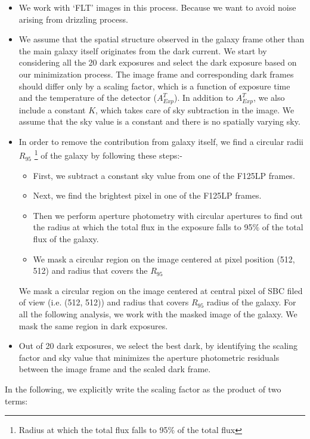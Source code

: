\documentclass[11pt]{article}
\begin{document}
\begin{itemize}
	\item We work with `FLT' images in this process. Because we want to avoid noise arising from drizzling process.
	\item We assume that the spatial structure observed in the galaxy frame other than the main galaxy itself originates from the dark current. We start by considering all the 20 dark exposures and select the dark exposure based on our minimization process. The image frame and corresponding dark frames should differ only by a scaling factor, which is a function of exposure time and the temperature of the detector ($A^T_{Exp}$). In addition to $A^T_{Exp}$, we also include a constant $K$, which takes care of sky subtraction in the image. We assume that the sky value is a constant and there is no spatially varying sky.
	\item In order to remove the contribution from galaxy itself, we find a circular radii $R_{95}$ \footnote{Radius at which the total flux falls to 95$\%$  of the total flux} of the galaxy by following these steps:-
	\begin{itemize}
		\item First, we subtract a constant sky value from one of the F125LP frames.
		\item Next, we find the brightest pixel in one of the F125LP frames. 
		\item Then we perform aperture photometry with circular apertures to find out the radius at which the total flux in the exposure falls to 95$\%$  of the total flux of the galaxy.
		\item We mask a circular region on the image centered at pixel position (512, 512) and radius that covers the $R_{95}$
	\end{itemize}  We mask a circular region on the image centered at central pixel of SBC filed of view (i.e. (512, 512)) and radius that covers $R_{95}$ radius of the galaxy. For all the following analysis, we work with the masked image of the galaxy. We mask the same region in dark exposures.

	 \item Out of 20 dark exposures, we select the best dark, by identifying the scaling factor and sky value that minimizes the aperture photometric residuals between the image frame and the scaled dark frame. 
\end{itemize}


In the following, we explicitly write the scaling factor as the product of two terms:
\end{document}
